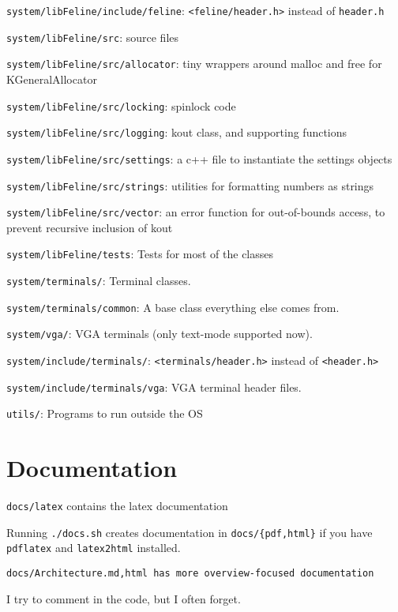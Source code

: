 \documentclass[12pt]{article}
\newcommand{\code}[1]{\colorbox{light-gray}{\texttt{#1}}}
\begin{document}
\begin{list}{}{}
\item \code{system/libFeline/include/feline}: \code{<feline/header.h>} instead of \code{header.h}
\item \code{system/libFeline/src}: source files
\item \code{system/libFeline/src/allocator}: tiny wrappers around malloc and free for KGeneralAllocator
\item \code{system/libFeline/src/locking}: spinlock code
\item \code{system/libFeline/src/logging}: kout class, and supporting functions
\item \code{system/libFeline/src/settings}: a c++ file to instantiate the settings objects
\item \code{system/libFeline/src/strings}: utilities for formatting numbers as strings
\item \code{system/libFeline/src/vector}: an error function for out-of-bounds access, to prevent recursive inclusion of kout
\item \code{system/libFeline/tests}: Tests for most of the classes
\item \code{system/terminals/}: Terminal classes.
\item \code{system/terminals/common}: A base class everything else comes from.
\item \code{system/vga/}: VGA terminals (only text-mode supported now).
\item \code{system/include/terminals/}: \code{<terminals/header.h>} instead of \code{<header.h>}
\item \code{system/include/terminals/vga}: VGA terminal header files.
\item \code{utils/}: Programs to run outside the OS
\end{list}

\section{Documentation}
\begin{list}{}{}
\item \code{docs/latex} contains the latex documentation
\item Running \code{./docs.sh} creates documentation in \code{docs/\{pdf,html\}} if you have \code{pdflatex} and \code{latex2html} installed.
\item \code{docs/Architecture.{md,html} has more overview-focused documentation}
\item I try to comment in the code, but I often forget.
\end{list}
\end{document}
